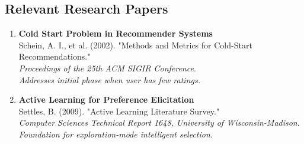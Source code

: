 \documentclass[12pt,a4paper]{article}
\begin{document}
\subsection{Relevant Research Papers}

\begin{enumerate}[resume]
    \item \textbf{Cold Start Problem in Recommender Systems}\\
    Schein, A. I., et al. (2002). "Methods and Metrics for Cold-Start Recommendations." \\
    \textit{Proceedings of the 25th ACM SIGIR Conference}.\\
    \textit{Addresses initial phase when user has few ratings.}
    
    \item \textbf{Active Learning for Preference Elicitation}\\
    Settles, B. (2009). "Active Learning Literature Survey." \\
    \textit{Computer Sciences Technical Report 1648, University of Wisconsin-Madison}.\\
    \textit{Foundation for exploration-mode intelligent selection.}
\end{enumerate}
\end{document}
